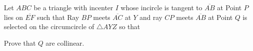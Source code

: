 Let $ABC$ be a triangle with incenter $I$ whose incircle is tangent to   $\overline{AB}$ at    Point $P$ lies on $\overline{EF}$ such that  Ray $BP$ meets $\overline{AC}$ at $Y$ and ray $CP$ meets $\overline{AB}$ at  Point $Q$ is selected on the circumcircle of $\triangle AYZ$ so that 

Prove that   $Q$ are collinear.